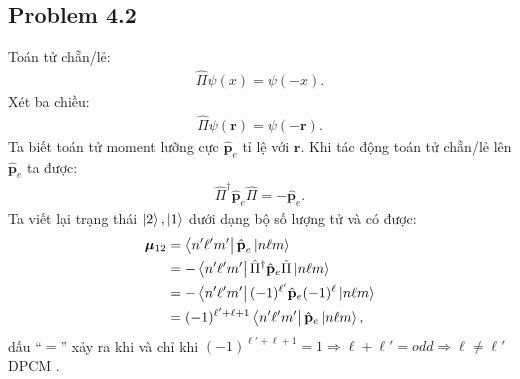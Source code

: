 \documentclass{article}
\renewcommand{\l}{\ell}
\begin{document}
\subsection*{Problem 4.2}
Toán tử chẵn/lẻ:
\begin{align*}
	\hat{\Pi} \psi(x) = \psi(-x).
\end{align*}
Xét ba chiều:
\begin{align*}
	\hat{\Pi} \psi(\mathbf{r}) = \psi(-\mathbf{r}).
\end{align*}
Ta biết toán tử moment lưỡng cực $\hat{\textbf{p}}_e$ tỉ lệ với $\mathbf{r}$. Khi tác động toán tử chẵn/lẻ lên $\hat{\textbf{p}}_e$ ta được:
\begin{align*}
	\hat{\Pi}^{\dagger} \hat{\textbf{p}}_e \hat{\Pi} = - \hat{\textbf{p}}_e.
\end{align*}
Ta viết lại trạng thái $\ket{2},\ket{1}$ dưới dạng bộ số lượng tử và có được:
\begin{align*}
	\boldsymbol{\mu}_{12}
	 & = \bra{n'\l'm'} \hat{\textbf{p}}_e \ket{n\l m}                                   \\
	 & =  - \bra{n'\l'm'}  \hat{\Pi}^{\dagger} \hat{\mathbf{p}}_e \hat{\Pi} \ket{n\l m} \\
	 & =  - \bra{n'\l'm'}  (-1)^{\l'} \hat{\mathbf{p}}_e (-1)^{\l} \ket{n\l m}          \\
	 & =(-1)^{\l' + \l + 1} \bra{n'\l'm'}   \hat{\mathbf{p}}_e \ket{n\l m},
\end{align*}
dấu ``$=$'' xảy ra khi và chỉ khi $ (-1)^{\l' + \l + 1} = 1 \Rightarrow \l + \l' = odd \Rightarrow \l \neq \l'$ DPCM .
\end{document}
